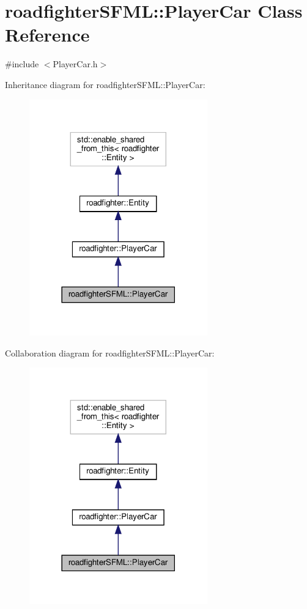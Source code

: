 \hypertarget{classroadfighterSFML_1_1PlayerCar}{}\section{roadfighter\+S\+F\+ML\+:\+:Player\+Car Class Reference}
\label{classroadfighterSFML_1_1PlayerCar}


{\ttfamily \#include $<$Player\+Car.\+h$>$}



Inheritance diagram for roadfighter\+S\+F\+ML\+:\+:Player\+Car\+:\nopagebreak
\begin{figure}[H]
\begin{center}
\leavevmode
\includegraphics[width=218pt]{classroadfighterSFML_1_1PlayerCar__inherit__graph}
\end{center}
\end{figure}


Collaboration diagram for roadfighter\+S\+F\+ML\+:\+:Player\+Car\+:\nopagebreak
\begin{figure}[H]
\begin{center}
\leavevmode
\includegraphics[width=218pt]{classroadfighterSFML_1_1PlayerCar__coll__graph}
\end{center}
\end{figure}
